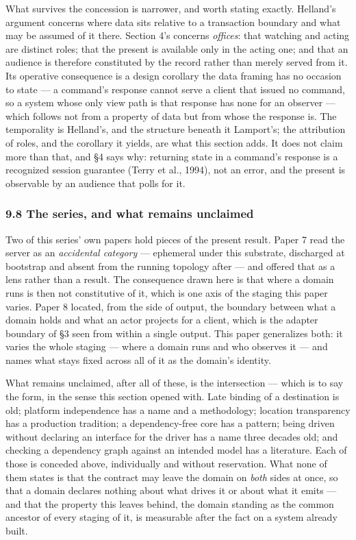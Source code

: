 \documentclass[
]{article}
\newcounter{none} %
\begin{document}
What survives the concession is narrower, and worth stating exactly.
Helland's argument concerns where data sits relative to a transaction
boundary and what may be assumed of it there. Section 4's concerns
\emph{offices}: that watching and acting are distinct roles; that the
present is available only in the acting one; and that an audience is
therefore constituted by the record rather than merely served from it.
Its operative consequence is a design corollary the data framing has no
occasion to state --- a command's response cannot serve a client that
issued no command, so a system whose only view path is that response has
none for an observer --- which follows not from a property of data but
from whose the response is. The temporality is Helland's, and the
structure beneath it Lamport's; the attribution of roles, and the
corollary it yields, are what this section adds. It does not claim more
than that, and §4 says why: returning state in a command's response is a
recognized session guarantee (Terry et al., 1994), not an error, and the
present is observable by an audience that polls for it.

\subsubsection{9.8 The series, and what remains
unclaimed}\label{the-series-and-what-remains-unclaimed}

Two of this series' own papers hold pieces of the present result. Paper
7 read the server as an \emph{accidental category} --- ephemeral under
this substrate, discharged at bootstrap and absent from the running
topology after --- and offered that as a lens rather than a result. The
consequence drawn here is that where a domain runs is then not
constitutive of it, which is one axis of the staging this paper varies.
Paper 8 located, from the side of output, the boundary between what a
domain holds and what an actor projects for a client, which is the
adapter boundary of §3 seen from within a single output. This paper
generalizes both: it varies the whole staging --- where a domain runs
and who observes it --- and names what stays fixed across all of it as
the domain's identity.

What remains unclaimed, after all of these, is the intersection ---
which is to say the form, in the sense this section opened with. Late
binding of a destination is old; platform independence has a name and a
methodology; location transparency has a production tradition; a
dependency-free core has a pattern; being driven without declaring an
interface for the driver has a name three decades old; and checking a
dependency graph against an intended model has a literature. Each of
those is conceded above, individually and without reservation. What none
of them states is that the contract may leave the domain on \emph{both}
sides at once, so that a domain declares nothing about what drives it or
about what it emits --- and that the property this leaves behind, the
domain standing as the common ancestor of every staging of it, is
measurable after the fact on a system already built.
\end{document}
